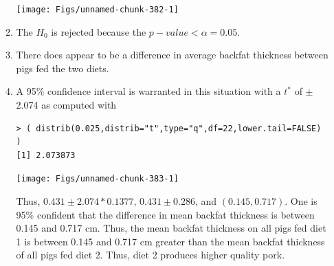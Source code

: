 \documentclass[10pt,openany]{book}\usepackage[]{graphicx}\usepackage[]{color}
\makeatletter
\newenvironment{kframe}{%
 \def\at@end@of@kframe{}%
 \ifinner\ifhmode%
  \def\at@end@of@kframe{\end{minipage}}%
  \begin{minipage}{\columnwidth}%
 \fi\fi%
 \def\FrameCommand##1{\hskip\@totalleftmargin \hskip-\fboxsep
 \colorbox{shadecolor}{##1}\hskip-\fboxsep
     \hskip-\linewidth \hskip-\@totalleftmargin \hskip\columnwidth}%
 \MakeFramed {\advance\hsize-\width
   \@totalleftmargin\z@ \linewidth\hsize
   \@setminipage}}%
 {\par\unskip\endMakeFramed%
 \at@end@of@kframe}
\newenvironment{knitrout}{}{} %
\makeatother
\begin{document}
\begin{itemize}
\begin{enumerate}
\begin{knitrout}
{\centering \texttt{[image: Figs/unnamed-chunk-382-1]} 

}



\end{knitrout}
      \item The $H_{0}$ is rejected because the $p-value <\alpha=0.05$.
      \item There does appear to be a difference in average backfat thickness between pigs fed the two diets.
      \item A 95\% confidence interval is warranted in this situation with a $t^{*}$ of $\pm$2.074 as computed with
\begin{knitrout}
\color{fgcolor}\begin{kframe}
\begin{verbatim}
> ( distrib(0.025,distrib="t",type="q",df=22,lower.tail=FALSE) )
[1] 2.073873
\end{verbatim}
\end{kframe}

{\centering \texttt{[image: Figs/unnamed-chunk-383-1]} 

}



\end{knitrout}
Thus, $0.431\pm2.074*0.1377$, $0.431\pm0.286$, and $(0.145,0.717)$.  One is 95\% confident that the difference in mean backfat thickness is between 0.145 and 0.717 cm.  Thus, the mean backfat thickness on all pigs fed diet 1 is between 0.145 and 0.717 cm greater than the mean backfat thickness of all pigs fed diet 2.  Thus, diet 2 produces higher quality pork.
    \end{enumerate}


\end{itemize}
\end{document}
